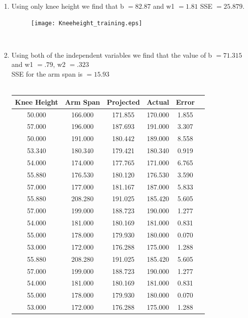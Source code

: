\documentclass[letterpaper,10pt,titlepage]{article}
\begin{document}
\begin{enumerate}
	\begin{enumerate} 	
		\item  Using only knee height we find that b $=82.87$ and w1 $= 1.81$ SSE $= 25.879$. \\

\begin{figure}[th!]
\centering
\texttt{[image: Kneeheight\_training.eps]} 
\end{figure} 
\\[10mm]
		\item Using both of the independent variables we find that the value of b $= 71.315$ and w1 $= .79$, w2 $= .323$ \\
SSE for the arm span is $= 15.93$ \\
\\[5mm]
\begin{tabular}{ | c | c | c | c | c | p{10cm} | }
\hline
Knee Height & Arm Span & Projected & Actual & Error \\ \hline
50.000      & 166.000  & 171.855   & 170.000 & 1.855 \\
57.000      & 196.000  & 187.693   & 191.000 & 3.307 \\
50.000      & 191.000  & 180.442   & 189.000 & 8.558 \\
53.340      & 180.340  & 179.421   & 180.340 & 0.919 \\
54.000      & 174.000  & 177.765   & 171.000 & 6.765 \\
55.880      & 176.530  & 180.120   & 176.530 & 3.590 \\
57.000      & 177.000  & 181.167   & 187.000 & 5.833 \\
55.880      & 208.280  & 191.025   & 185.420 & 5.605 \\
57.000      & 199.000  & 188.723   & 190.000 & 1.277 \\
54.000      & 181.000  & 180.169   & 181.000 & 0.831 \\
55.000      & 178.000  & 179.930   & 180.000 & 0.070 \\
53.000      & 172.000  & 176.288   & 175.000 & 1.288 \\
55.880      & 208.280  & 191.025   & 185.420 & 5.605 \\
57.000      & 199.000  & 188.723   & 190.000 & 1.277 \\
54.000      & 181.000  & 180.169   & 181.000 & 0.831 \\
55.000      & 178.000  & 179.930   & 180.000 & 0.070 \\
53.000      & 172.000  & 176.288   & 175.000 & 1.288 \\

\end{tabular}
\end{enumerate}
\end{enumerate}
\end{document}
